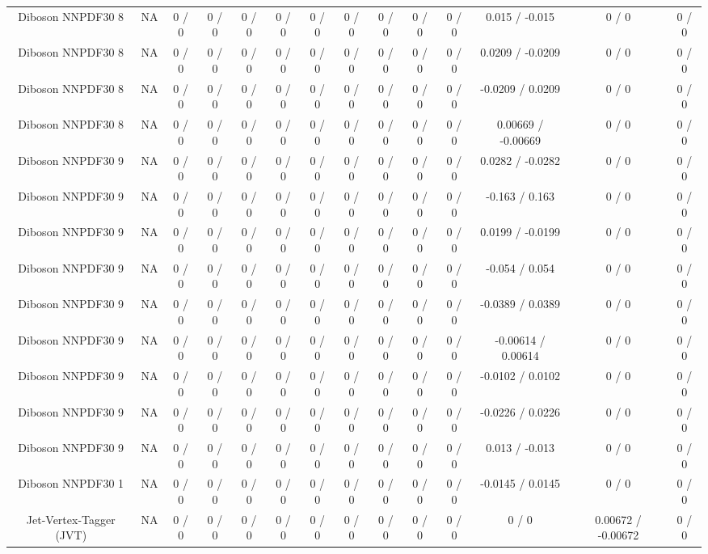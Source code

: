 \documentclass[10pt]{article}
\begin{document}
\begin{table}[htbp]
\begin{center}
\begin{tabular}{|c|c|c|c|c|c|c|c|c|c|c|c|c|c|}
  Diboson NNPDF30 8 &    NA    & 0 / 0 & 0 / 0 & 0 / 0 & 0 / 0 & 0 / 0 & 0 / 0 & 0 / 0 & 0 / 0 & 0 / 0 & 0.015 / -0.015 & 0 / 0 & 0 / 0 \\ 
  Diboson NNPDF30 8 &    NA    & 0 / 0 & 0 / 0 & 0 / 0 & 0 / 0 & 0 / 0 & 0 / 0 & 0 / 0 & 0 / 0 & 0 / 0 & 0.0209 / -0.0209 & 0 / 0 & 0 / 0 \\ 
  Diboson NNPDF30 8 &    NA    & 0 / 0 & 0 / 0 & 0 / 0 & 0 / 0 & 0 / 0 & 0 / 0 & 0 / 0 & 0 / 0 & 0 / 0 & -0.0209 / 0.0209 & 0 / 0 & 0 / 0 \\ 
  Diboson NNPDF30 8 &    NA    & 0 / 0 & 0 / 0 & 0 / 0 & 0 / 0 & 0 / 0 & 0 / 0 & 0 / 0 & 0 / 0 & 0 / 0 & 0.00669 / -0.00669 & 0 / 0 & 0 / 0 \\ 
  Diboson NNPDF30 9 &    NA    & 0 / 0 & 0 / 0 & 0 / 0 & 0 / 0 & 0 / 0 & 0 / 0 & 0 / 0 & 0 / 0 & 0 / 0 & 0.0282 / -0.0282 & 0 / 0 & 0 / 0 \\ 
  Diboson NNPDF30 9 &    NA    & 0 / 0 & 0 / 0 & 0 / 0 & 0 / 0 & 0 / 0 & 0 / 0 & 0 / 0 & 0 / 0 & 0 / 0 & -0.163 / 0.163 & 0 / 0 & 0 / 0 \\ 
  Diboson NNPDF30 9 &    NA    & 0 / 0 & 0 / 0 & 0 / 0 & 0 / 0 & 0 / 0 & 0 / 0 & 0 / 0 & 0 / 0 & 0 / 0 & 0.0199 / -0.0199 & 0 / 0 & 0 / 0 \\ 
  Diboson NNPDF30 9 &    NA    & 0 / 0 & 0 / 0 & 0 / 0 & 0 / 0 & 0 / 0 & 0 / 0 & 0 / 0 & 0 / 0 & 0 / 0 & -0.054 / 0.054 & 0 / 0 & 0 / 0 \\ 
  Diboson NNPDF30 9 &    NA    & 0 / 0 & 0 / 0 & 0 / 0 & 0 / 0 & 0 / 0 & 0 / 0 & 0 / 0 & 0 / 0 & 0 / 0 & -0.0389 / 0.0389 & 0 / 0 & 0 / 0 \\ 
  Diboson NNPDF30 9 &    NA    & 0 / 0 & 0 / 0 & 0 / 0 & 0 / 0 & 0 / 0 & 0 / 0 & 0 / 0 & 0 / 0 & 0 / 0 & -0.00614 / 0.00614 & 0 / 0 & 0 / 0 \\ 
  Diboson NNPDF30 9 &    NA    & 0 / 0 & 0 / 0 & 0 / 0 & 0 / 0 & 0 / 0 & 0 / 0 & 0 / 0 & 0 / 0 & 0 / 0 & -0.0102 / 0.0102 & 0 / 0 & 0 / 0 \\ 
  Diboson NNPDF30 9 &    NA    & 0 / 0 & 0 / 0 & 0 / 0 & 0 / 0 & 0 / 0 & 0 / 0 & 0 / 0 & 0 / 0 & 0 / 0 & -0.0226 / 0.0226 & 0 / 0 & 0 / 0 \\ 
  Diboson NNPDF30 9 &    NA    & 0 / 0 & 0 / 0 & 0 / 0 & 0 / 0 & 0 / 0 & 0 / 0 & 0 / 0 & 0 / 0 & 0 / 0 & 0.013 / -0.013 & 0 / 0 & 0 / 0 \\ 
  Diboson NNPDF30 1 &    NA    & 0 / 0 & 0 / 0 & 0 / 0 & 0 / 0 & 0 / 0 & 0 / 0 & 0 / 0 & 0 / 0 & 0 / 0 & -0.0145 / 0.0145 & 0 / 0 & 0 / 0 \\ 
  Jet-Vertex-Tagger (JVT) &    NA    & 0 / 0 & 0 / 0 & 0 / 0 & 0 / 0 & 0 / 0 & 0 / 0 & 0 / 0 & 0 / 0 & 0 / 0 & 0 / 0 & 0.00672 / -0.00672 & 0 / 0 \\ 

\end{tabular}
\end{center}
\end{table}
\end{document}
